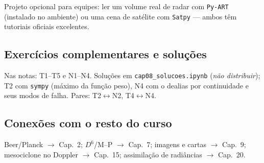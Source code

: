 Projeto opcional para equipes: ler um volume real de radar com
\texttt{Py-ART} (instalado no ambiente) ou uma cena de satélite com
\texttt{Satpy} — ambos têm tutoriais oficiais excelentes.

\subsection*{Exercícios complementares e soluções}

Nas notas: T1--T5 e N1--N4. Soluções em \texttt{cap08\_solucoes.ipynb}
(\emph{não distribuir}); T2 com \texttt{sympy} (máximo da função peso),
N4 com o dealias por continuidade e seus modos de falha.
Pares: T2$\leftrightarrow$N2, T4$\leftrightarrow$N4.

\subsection*{Conexões com o resto do curso}

Beer/Planck $\to$ Cap.~2; $D^6$/M--P $\to$ Cap.~7; imagens e cartas $\to$
Cap.~9; mesociclone no Doppler $\to$ Cap.~15; assimilação de radiâncias
$\to$ Cap.~20.
